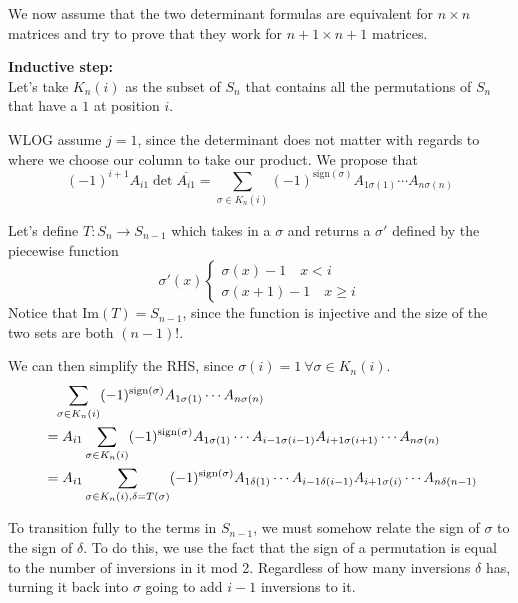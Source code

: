 \documentclass[12pt]{article}
\begin{document}
\begin{enumerate}
\begin{enumerate}
                        We now assume that the two determinant formulas are equivalent for $n \times n$ matrices
                        and try to prove that they work for $n+1 \times n+1$ matrices.

                        \textbf{Inductive step:} \\
                        Let's take $K_n(i)$ as the subset of $S_n$ that contains
                        all the permutations of $S_n$ that have a $1$ at position $i$.

                        WLOG assume $j=1$, since the determinant does not matter with regards to where we choose our column to take our product.
                        We propose that
                        \[(-1)^{i+1}A_{i1} \det \overline{A_{i1}}=\sum_{\sigma \in K_n(i)} (-1)^{\text{sign}(\sigma)} A_{1\sigma(1)} \cdots A_{n\sigma(n)}\]

                        Let's define $T: S_n \rightarrow S_{n-1}$ which
                        takes in a $\sigma$ and returns a $\sigma'$ defined by the piecewise function
                        \[\sigma'(x)\begin{cases}
                                    \sigma(x)-1\quad x < i \\
                                    \sigma(x+1)-1\quad x \ge i
                              \end{cases}\]
                        Notice that $\text{Im}(T)=S_{n-1}$, since the function is injective and the size of the two sets are both $(n-1)!$.

                        We can then simplify the RHS, since $\sigma(i)=1\ \forall \sigma \in K_n(i)$.
                        \begin{align*}
                               & \hphantom{=} \sum_{\sigma \in K_n(i)} (-1)^{\text{sign}(\sigma)} A_{1\sigma(1)} \cdots A_{n\sigma(n)}                                                         \\
                               & =A_{i1}\sum_{\sigma \in K_n(i)} (-1)^{\text{sign}(\sigma)} A_{1\sigma(1)} \cdots A_{i-1\sigma(i-1)}A_{i+1\sigma(i+1)}  \cdots A_{n\sigma(n)}                  \\
                               & =A_{i1}\sum_{\sigma \in K_n(i), \delta=T(\sigma)} (-1)^{\text{sign}(\sigma)} A_{1\delta(1)} \cdots A_{i-1\delta(i-1)}A_{i+1\sigma(i)} \cdots A_{n\delta(n-1)}
                        \end{align*}

                        To transition fully to the terms in $S_{n-1}$, we must somehow relate
                        the sign of $\sigma$ to the sign of $\delta$.
                        To do this, we use the fact that the sign of a permutation is equal to the number of inversions in it mod 2.
                        Regardless of how many inversions $\delta$ has,
                        turning it back into $\sigma$ going to add $i-1$ inversions to it.


\end{enumerate}
\end{enumerate}
\end{document}
